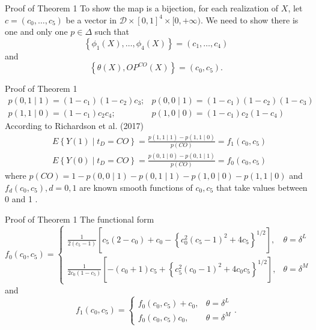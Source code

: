 \documentclass[aspectratio=169,xcolor=dvipsnames]{beamer}
\begin{document}
\begin{frame}{Proof of Theorem 1}
To show the map is a bijection, for each realization of $X$, let $c=\left(c_{0}, \ldots, c_{5}\right)$ be a vector in $\mathcal{D} \times[0,1]^{4} \times[0,+\infty)$. We need to show there is one and only one $p \in \Delta$ such that
$$
\left\{\phi_{1}(X), \ldots, \phi_{4}(X)\right\}=\left(c_{1}, \ldots, c_{4}\right)
$$
and
$$
\left\{\theta(X), O P^{C O}(X)\right\}=\left(c_{0}, c_{5}\right) .
$$
\end{frame}

\begin{frame}{Proof of Theorem 1}
$$
\begin{aligned}
p(0,1 \mid 1)=\left(1-c_{1}\right)\left(1-c_{2}\right) c_{3} ; & p(0,0 \mid 1)=\left(1-c_{1}\right)\left(1-c_{2}\right)\left(1-c_{3}\right) \\
p(1,1 \mid 0)=\left(1-c_{1}\right) c_{2} c_{4} ; & p(1,0 \mid 0)=\left(1-c_{1}\right) c_{2}\left(1-c_{4}\right)
\end{aligned}
$$
According to Richardson et al. (2017)
$$
\begin{aligned}
&E\left\{Y(1) \mid t_{D}=C O\right\}=\frac{p(1,1 \mid 1)-p(1,1 \mid 0)}{p(C O)}=f_{1}\left(c_{0}, c_{5}\right) \\
&E\left\{Y(0) \mid t_{D}=C O\right\}=\frac{p(0,1 \mid 0)-p(0,1 \mid 1)}{p(C O)}=f_{0}\left(c_{0}, c_{5}\right)
\end{aligned}
$$
where $p(C O)=1-p(0,0 \mid 1)-p(0,1 \mid 1)-p(1,0 \mid 0)-p(1,1 \mid 0)$ and $f_{d}\left(c_{0}, c_{5}\right), d=0,1$ are known smooth functions of $c_{0}, c_{5}$ that take values between 0 and 1 . 
\end{frame}

\begin{frame}{Proof of Theorem 1}
The functional form
$$
f_{0}\left(c_{0}, c_{5}\right)= \begin{cases}\frac{1}{2\left(c_{5}-1\right)}\left[c_{5}\left(2-c_{0}\right)+c_{0}-\left\{c_{0}^{2}\left(c_{5}-1\right)^{2}+4 c_{5}\right\}^{1 / 2}\right], & \theta=\delta^{L} \\ \frac{1}{2 c_{0}\left(1-c_{5}\right)}\left[-\left(c_{0}+1\right) c_{5}+\left\{c_{5}^{2}\left(c_{0}-1\right)^{2}+4 c_{0} c_{5}\right\}^{1 / 2}\right], & \theta=\delta^{M}\end{cases}
$$
and
$$
f_{1}\left(c_{0}, c_{5}\right)=\left\{\begin{array}{ll}
f_{0}\left(c_{0}, c_{5}\right)+c_{0}, & \theta=\delta^{L} \\
f_{0}\left(c_{0}, c_{5}\right) c_{0}, & \theta=\delta^{M}
\end{array} .\right.
$$
\end{frame}
\end{document}
